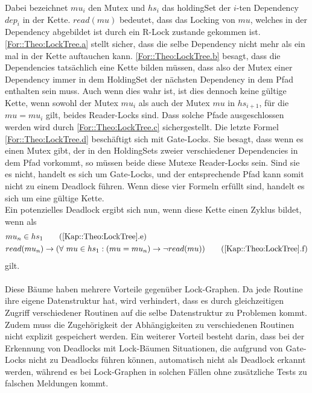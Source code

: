 Dabei bezeichnet $mu_i$ den Mutex und $hs_i$ das holdingSet der $i$-ten 
Dependency $dep_i$ in der Kette. $read(mu)$ bedeutet, dass das Locking von $mu$, welches 
in der Dependency abgebildet ist durch ein R-Lock zustande gekommen ist.\\
\eqref{For::Theo:LockTree.a} stellt sicher, dass die selbe 
Dependency nicht mehr als ein mal in der Kette auftauchen kann.  
\eqref{For::Theo:LockTree.b} besagt, dass die Dependencies tatsächlich
eine Kette bilden müssen, dass also der Mutex einer Dependency immer in dem 
HoldingSet der nächsten Dependency in dem Pfad enthalten sein muss. 
Auch wenn dies wahr ist, ist dies dennoch keine gültige Kette, wenn sowohl der
Mutex $mu_i$ als auch der Mutex $mu$ in $hs_{i+1}$, für die $mu = mu_i$ gilt, 
beides Reader-Locks sind. Dass solche Pfade ausgeschlossen werden wird durch 
\eqref{For::Theo:LockTree.c} sichergestellt. Die letzte Formel 
\eqref{For::Theo:LockTree.d} beschäftigt sich mit Gate-Locks. 
Sie besagt, dass wenn es einen Mutex gibt, 
der in den HoldingSets zweier verschiedener Dependencies in dem Pfad vorkommt, 
so müssen beide diese Mutexe Reader-Locks sein. Sind sie es nicht, handelt es 
sich um Gate-Locks, und der entsprechende Pfad kann somit nicht zu einem 
Deadlock führen. Wenn diese vier Formeln erfüllt sind, handelt es sich um eine 
gültige Kette.\\
Ein potenzielles Deadlock ergibt sich nun, wenn diese Kette einen Zyklus 
bildet, wenn als 
\begin{align}
  &mu_n \in hs_{1} 
  \tag{\ref{Kap::Theo:LockTree}.e}
  \label{For::Implementation:Periodical.e}\\
  &read(mu_n) \rightarrow 
  (\forall\ mu \in hs_{1}: (mu = mu_n) \to \lnot read(mu))
  \tag{\ref{Kap::Theo:LockTree}.f}
  \label{For::Implementation:Periodical.f}
\end{align}
gilt.\\\\
Diese Bäume haben mehrere Vorteile gegenüber Lock-Graphen. Da jede Routine ihre 
eigene Datenstruktur hat, wird verhindert, dass es durch 
gleichzeitigen Zugriff verschiedener Routinen auf die selbe Datenstruktur zu 
Problemen kommt. Zudem muss die Zugehörigkeit der Abhängigkeiten zu 
verschiedenen Routinen nicht explizit gespeichert werden. Ein weiterer Vorteil 
besteht darin, dass bei der Erkennung von Deadlocks mit Lock-Bäumen Situationen,
die aufgrund von Gate-Locks nicht zu Deadlocks führen können, automatisch nicht
als Deadlock erkannt werden, während es bei Lock-Graphen in solchen Fällen ohne 
zusätzliche Tests zu falschen Meldungen kommt.  

